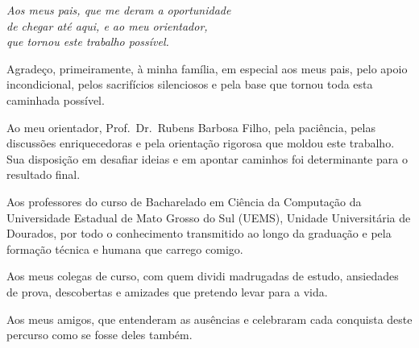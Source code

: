 \documentclass[
      12pt,
      a4paper,
      openright,
      oneside,
      chapter=TITLE,
      section=TITLE,
      english,
      french,
      spanish,
      brazilian
    ]{abntex2}
\begin{document}
    \begin{dedicatoria}
        \vspace*{\fill}
        \begin{flushright}
            \textit{Aos meus pais, que me deram a oportunidade\\
            de chegar até aqui, e ao meu orientador,\\
            que tornou este trabalho possível.}
        \end{flushright}
        \vspace*{1cm}
    \end{dedicatoria}
    
    \begin{agradecimentos}
    
    Agradeço, primeiramente, à minha família, em especial aos meus pais, pelo apoio incondicional, pelos sacrifícios silenciosos e pela base que tornou toda esta caminhada possível.
    
    Ao meu orientador, Prof.\ Dr.\ Rubens Barbosa Filho, pela paciência, pelas discussões enriquecedoras e pela orientação rigorosa que moldou este trabalho. Sua disposição em desafiar ideias e em apontar caminhos foi determinante para o resultado final.
    
    Aos professores do curso de Bacharelado em Ciência da Computação da Universidade Estadual de Mato Grosso do Sul (UEMS), Unidade Universitária de Dourados, por todo o conhecimento transmitido ao longo da graduação e pela formação técnica e humana que carrego comigo.
    
    Aos meus colegas de curso, com quem dividi madrugadas de estudo, ansiedades de prova, descobertas e amizades que pretendo levar para a vida.
    
    Aos meus amigos, que entenderam as ausências e celebraram cada conquista deste percurso como se fosse deles também.
    
    \end{agradecimentos}
    
\end{document}
